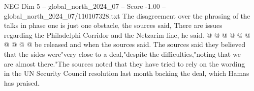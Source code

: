 \begin{textsample}{NEG Dim 5 – global\_north\_2024\_07 – Score -1.00 – global\_north\_2024\_07/110107328.txt}
The disagreement over the phrasing of the talks in phase one is just one obstacle, the sources said, There are issues regarding the Philadelphi Corridor and the Netzarim line, he said. @ @ @ @ @ @ @ @ @ @ be released and when the sources said.
The sources said they believed that the sides were"very close to a deal,"despite the difficulties,"noting that we are almost there."The sources noted that they have tried to rely on the wording in the UN Security Council resolution last month backing the deal, which Hamas has praised.

\end{textsample}

